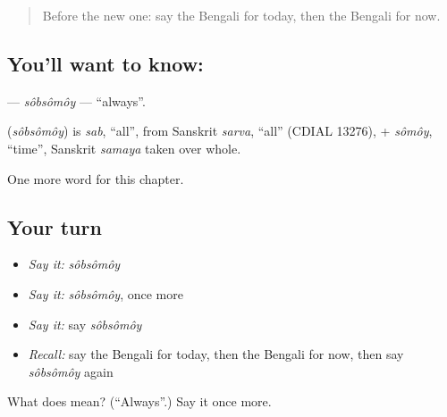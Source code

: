 \label{lesson:BN-C79-sobsomoy}



\begin{quote}
Before the new one: say the Bengali for today, then the Bengali for now.
\end{quote}

\subsection*{You'll want to know: }
\textbf{} — \emph{sôbsômôy} — \textquotedblleft{}always\textquotedblright{}.

\begin{cousinweb}
\textbf{} (\emph{sôbsômôy}) is \emph{sab}, \textquotedblleft{}all\textquotedblright{}, from Sanskrit \emph{sarva}, \textquotedblleft{}all\textquotedblright{} (CDIAL 13276), + \emph{sômôy}, \textquotedblleft{}time\textquotedblright{}, Sanskrit \emph{samaya} taken over whole.
\end{cousinweb}

\begin{grammarlens}[title={What you've built}]
One more word for this chapter.
\end{grammarlens}

\subsection*{Your turn}
\begin{itemize}
\raggedright
  \item \emph{Say it:} \emph{sôbsômôy}
  \item \emph{Say it:} \emph{sôbsômôy}, once more
  \item \emph{Say it:} say \emph{sôbsômôy}
  \item \emph{Recall:} say the Bengali for today, then the Bengali for now, then say \emph{sôbsômôy} again
\end{itemize}

\begin{tcolorbox}[breakable,colback=teal!4,colframe=teal!35!black,title={Before you move on}]
What does  mean? (\textquotedblleft{}Always\textquotedblright{}.) Say it once more.
\end{tcolorbox}
